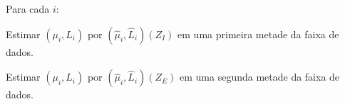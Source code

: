 


Para cada $i$:
  
Estimar $(\mu_i, L_i )$ por $(\hat{\mu}_i, \hat{L}_i)(Z_I)$ em uma primeira metade da faixa de dados.

Estimar $(\mu_i, L_i )$ por $(\hat{\mu}_i, \hat{L}_i)(Z_E)$ em uma segunda metade da faixa de dados.

